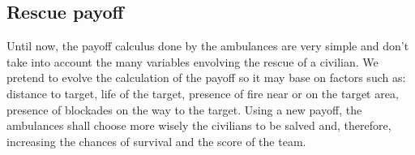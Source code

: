 \subsection{Rescue payoff}
	\label{subsec:rescuepayoff}
	
Until now, the payoff calculus done by the ambulances are very simple and don't take into account the many variables envolving the rescue of a civilian. We pretend to evolve the calculation of the payoff so it may base on factors such as: distance to target, life of the target, presence of fire near or on the target area, presence of blockades on the way to the target. Using a new payoff, the ambulances shall choose more wisely the civilians to be salved and, therefore, increasing the chances of survival and the score of the team.
